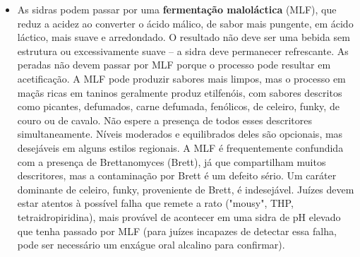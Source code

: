 \begin{itemize}
\item As sidras podem passar por uma \textbf{fermentação maloláctica} (MLF), que reduz a acidez ao converter o ácido málico, de sabor mais pungente, em ácido láctico, mais suave e arredondado. O resultado não deve ser uma bebida sem estrutura ou excessivamente suave – a sidra deve permanecer refrescante. As peradas não devem passar por MLF porque o processo pode resultar em acetificação. A MLF pode produzir sabores mais limpos, mas o processo em maçãs ricas em taninos geralmente produz etilfenóis, com sabores descritos como picantes, defumados, carne defumada, fenólicos, de celeiro, funky, de couro ou de cavalo. Não espere a presença de todos esses descritores simultaneamente. Níveis moderados e equilibrados deles são opcionais, mas desejáveis em alguns estilos regionais. A MLF é frequentemente confundida com a presença de Brettanomyces (Brett), já que compartilham muitos descritores, mas a contaminação por Brett é um defeito sério. Um caráter dominante de celeiro, funky, proveniente de Brett, é indesejável. Juízes devem estar atentos à possível falha que remete a rato ("mousy", THP, tetraidropiridina), mais provável de acontecer em uma sidra de pH elevado que tenha passado por MLF (para juízes incapazes de detectar essa falha, pode ser necessário um enxágue oral alcalino para confirmar).
\end{itemize}
